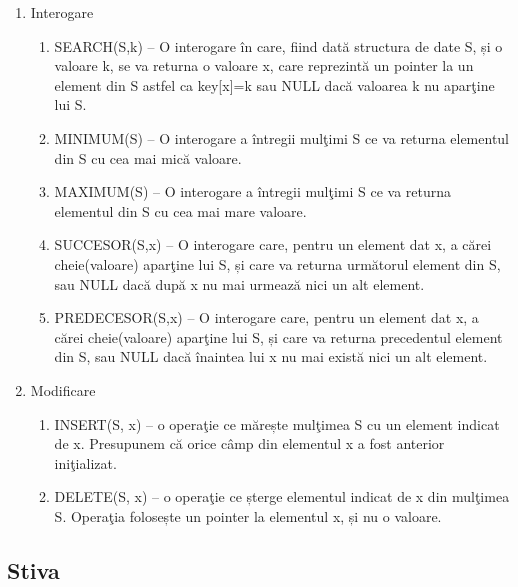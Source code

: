 \begin{enumerate}
	\item {
		Interogare
		\begin{enumerate}
			\item {
				SEARCH(S,k) – O interogare în care, fiind dată structura de date S, și o valoare k, se va returna o valoare x, care reprezintă un pointer la un element din S astfel ca key[x]=k sau NULL dacă valoarea k nu aparţine lui S.
			}
			\item {
				MINIMUM(S) – O interogare a întregii mulţimi S ce va returna elementul din S cu cea mai mică valoare.
			}
			\item {
				MAXIMUM(S) – O interogare a întregii mulţimi S ce va returna elementul din S cu cea mai mare valoare.
			}
			\item {
				SUCCESOR(S,x) – O interogare care, pentru un element dat x, a cărei 	cheie(valoare) aparţine lui S, și care va returna următorul element din S, sau NULL dacă după x nu mai urmează nici un alt element.
			}
			\item {
				PREDECESOR(S,x) – O interogare care, pentru un element dat x, a cărei 	cheie(valoare) aparţine lui S, și care va returna precedentul element din S, sau NULL dacă înaintea lui x nu mai există nici un alt element.
			}
		\end{enumerate}
	}
	\item {
		Modificare
		\begin{enumerate}
			\item {
				INSERT(S, x) – o operaţie ce mărește mulţimea S cu un element indicat de x.
				Presupunem că orice câmp din elementul x a fost anterior iniţializat.
			}
			\item {
				DELETE(S, x) – o operaţie ce șterge elementul indicat de x din mulţimea S.
				Operaţia folosește un pointer la elementul x, și nu o valoare.
			}
		\end{enumerate}
	}
\end{enumerate}


\subsection{Stiva}

